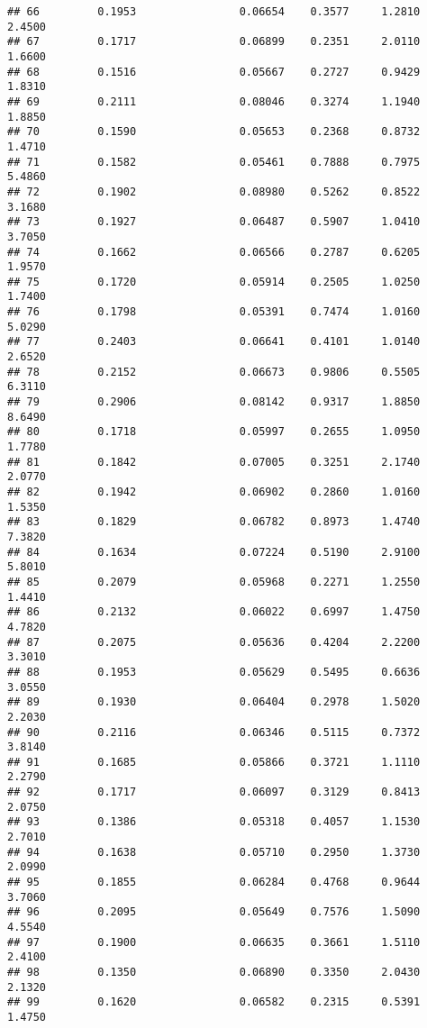 \documentclass[
]{article}
\begin{document}
\begin{verbatim}
## 66         0.1953                0.06654    0.3577     1.2810       2.4500
## 67         0.1717                0.06899    0.2351     2.0110       1.6600
## 68         0.1516                0.05667    0.2727     0.9429       1.8310
## 69         0.2111                0.08046    0.3274     1.1940       1.8850
## 70         0.1590                0.05653    0.2368     0.8732       1.4710
## 71         0.1582                0.05461    0.7888     0.7975       5.4860
## 72         0.1902                0.08980    0.5262     0.8522       3.1680
## 73         0.1927                0.06487    0.5907     1.0410       3.7050
## 74         0.1662                0.06566    0.2787     0.6205       1.9570
## 75         0.1720                0.05914    0.2505     1.0250       1.7400
## 76         0.1798                0.05391    0.7474     1.0160       5.0290
## 77         0.2403                0.06641    0.4101     1.0140       2.6520
## 78         0.2152                0.06673    0.9806     0.5505       6.3110
## 79         0.2906                0.08142    0.9317     1.8850       8.6490
## 80         0.1718                0.05997    0.2655     1.0950       1.7780
## 81         0.1842                0.07005    0.3251     2.1740       2.0770
## 82         0.1942                0.06902    0.2860     1.0160       1.5350
## 83         0.1829                0.06782    0.8973     1.4740       7.3820
## 84         0.1634                0.07224    0.5190     2.9100       5.8010
## 85         0.2079                0.05968    0.2271     1.2550       1.4410
## 86         0.2132                0.06022    0.6997     1.4750       4.7820
## 87         0.2075                0.05636    0.4204     2.2200       3.3010
## 88         0.1953                0.05629    0.5495     0.6636       3.0550
## 89         0.1930                0.06404    0.2978     1.5020       2.2030
## 90         0.2116                0.06346    0.5115     0.7372       3.8140
## 91         0.1685                0.05866    0.3721     1.1110       2.2790
## 92         0.1717                0.06097    0.3129     0.8413       2.0750
## 93         0.1386                0.05318    0.4057     1.1530       2.7010
## 94         0.1638                0.05710    0.2950     1.3730       2.0990
## 95         0.1855                0.06284    0.4768     0.9644       3.7060
## 96         0.2095                0.05649    0.7576     1.5090       4.5540
## 97         0.1900                0.06635    0.3661     1.5110       2.4100
## 98         0.1350                0.06890    0.3350     2.0430       2.1320
## 99         0.1620                0.06582    0.2315     0.5391       1.4750

\end{verbatim}
\end{document}
